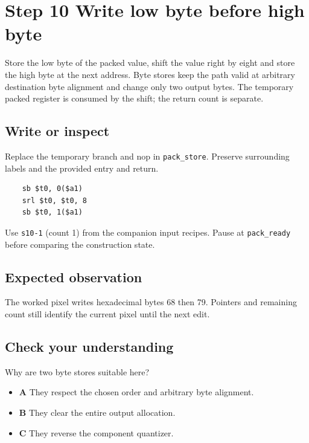 \section{Step 10 Write low byte before high byte}\label{rgb-s10}

Store the low byte of the packed value, shift the value right by eight and store the high byte at the next address. Byte stores keep the path valid at arbitrary destination byte alignment and change only two output bytes. The temporary packed register is consumed by the shift; the return count is separate.

\subsection{Write or inspect}
Replace the temporary branch and nop in \texttt{pack\_store}. Preserve surrounding labels and the provided entry and return.

\begin{verbatim}
    sb $t0, 0($a1)
    srl $t0, $t0, 8
    sb $t0, 1($a1)
\end{verbatim}
Use \texttt{s10-1} (count 1) from the companion input recipes. Pause at \texttt{pack\_ready} before comparing the construction state.

\subsection{Expected observation}
The worked pixel writes hexadecimal bytes 68 then 79. Pointers and remaining count still identify the current pixel until the next edit.

\subsection{Check your understanding}
Why are two byte stores suitable here?

\begin{itemize}
  \item \textbf{A} They respect the chosen order and arbitrary byte alignment.
  \item \textbf{B} They clear the entire output allocation.
  \item \textbf{C} They reverse the component quantizer.
\end{itemize}

